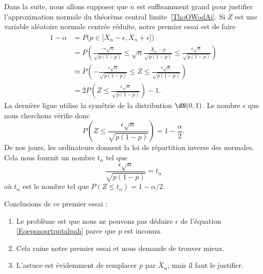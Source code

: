Dans la suite, nous allons supposer que \( n\) est suffisamment grand pour justifier l'approximation normale du théorème central limite~\ref{ThoOWodAi}. Si \( Z\) est une variable aléatoire normale centrée réduite, notre premier essai est de faire
\begin{subequations}
    \begin{align}
        1-\alpha&=P\big( p\in\mathopen[ \bar X_n-\epsilon , \bar X_n+\epsilon \mathclose] \big) \label{subEqumaleftLthe}\\
        &=P\left( \frac{ -\epsilon\sqrt{n} }{ \sqrt{p(1-p)} }\leq \sqrt{n}\frac{ \bar X_n-p }{ \sqrt{p(1-p)} }\leq \frac{ \epsilon\sqrt{n} }{ \sqrt{p(1-p)} } \right)\\
        &\simeq P\left( -\frac{ \epsilon\sqrt{n} }{ \sqrt{p(1-p)} }\leq Z\leq \frac{ \epsilon\sqrt{n} }{ \sqrt{p(1-p)} } \right)\\
        &=2P\left( Z\leq \frac{ \epsilon\sqrt{n} }{ \sqrt{p(1-p)} } \right)-1.
    \end{align}
\end{subequations}
La dernière ligne utilise la symétrie de la distribution \( \dN(0,1)\). Le nombre \( \epsilon\) que nous cherchons vérifie donc
\begin{equation}
    P\left( Z\leq \frac{ \epsilon\sqrt{n} }{ \sqrt{p(1-p)} } \right)=1-\frac{ \alpha }{2}.
\end{equation}
De nos jours, les ordinateurs donnent la loi de répartition inverse des normales. Cela nous fournit un nombre \( t_{\alpha}\) tel que
\begin{equation}    \label{Eqepsnqsrtpptalpah}
    \frac{ \epsilon\sqrt{n} }{ \sqrt{p(1-p)} }=t_{\alpha}
\end{equation}
où \( t_{\alpha}\) est le nombre tel que \( P(Z\leq t_{\alpha})=1-\alpha/2\).

Conclusions de ce premier essai :
\begin{enumerate}
    \item

Le problème est que nous ne pouvons pas déduire \( \epsilon\) de l'équation \eqref{Eqepsnqsrtpptalpah} parce que \( p\) est inconnu.

\item
Cela ruine notre premier essai et nous demande de trouver mieux.

\item
L'astuce est évidemment de remplacer \( p\) par \( \bar X_n\), mais il faut le justifier.

\end{enumerate}

